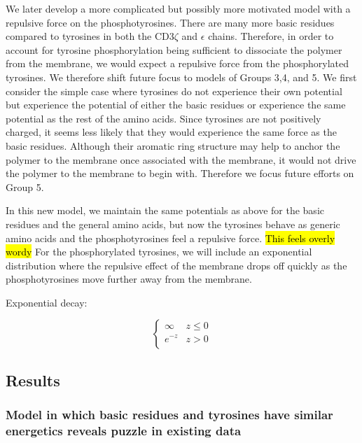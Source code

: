 \documentclass[../../AdvancementSummary.tex]{subfiles}
\begin{document}
{We later develop a more complicated but possibly more motivated model with a repulsive force on the phosphotyrosines. There are many more basic residues compared to tyrosines in both the CD3$\zeta$ and $\epsilon$ chains.  Therefore, in order to account for tyrosine phosphorylation being sufficient to dissociate the polymer from the membrane, we would expect a repulsive force from the phosphorylated tyrosines. We therefore shift future focus to models of Groups 3,4, and 5. We first consider the simple case where tyrosines do not experience their own potential but experience the potential of either the basic residues or experience the same potential as the rest of the amino acids.  Since tyrosines are not positively charged, it seems less likely that they would experience the same force as the basic residues.  Although their aromatic ring structure may help to anchor the polymer to the membrane once associated with the membrane, it would not drive the polymer to the membrane to begin with. \cite{Lopez2015} Therefore we focus future efforts on Group 5.

In this new model, we maintain the same potentials as above for the basic residues and the general amino acids, but now the tyrosines behave as generic amino acids and the phosphotyrosines feel a repulsive force. \hl{This feels overly wordy} For the phosphorylated tyrosines, we will include an exponential distribution where the repulsive effect of the membrane drops off quickly as the phosphotyrosines move further away from the membrane.


Exponential decay:


\begin{equation}\label{eq: exponential}
\begin{cases}
\infty	& z \leq 0\\
e^{-z} & z > 0 \\
\end{cases}
\end{equation}


\subsection{Results}
\subsubsection{Model in which basic residues and tyrosines have similar energetics reveals puzzle in existing data}

}
\end{document}
